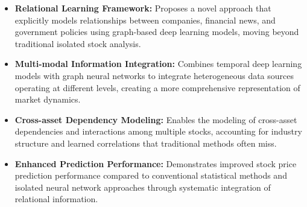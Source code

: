 \begin{itemize}
    \item \textbf{Relational Learning Framework:} Proposes a novel approach that explicitly models relationships between companies, financial news, and government policies using graph-based deep learning models, moving beyond traditional isolated stock analysis.
    
    \item \textbf{Multi-modal Information Integration:} Combines temporal deep learning models with graph neural networks to integrate heterogeneous data sources operating at different levels, creating a more comprehensive representation of market dynamics.
    
    \item \textbf{Cross-asset Dependency Modeling:} Enables the modeling of cross-asset dependencies and interactions among multiple stocks, accounting for industry structure and learned correlations that traditional methods often miss.
    
    \item \textbf{Enhanced Prediction Performance:} Demonstrates improved stock price prediction performance compared to conventional statistical methods and isolated neural network approaches through systematic integration of relational information.
\end{itemize}